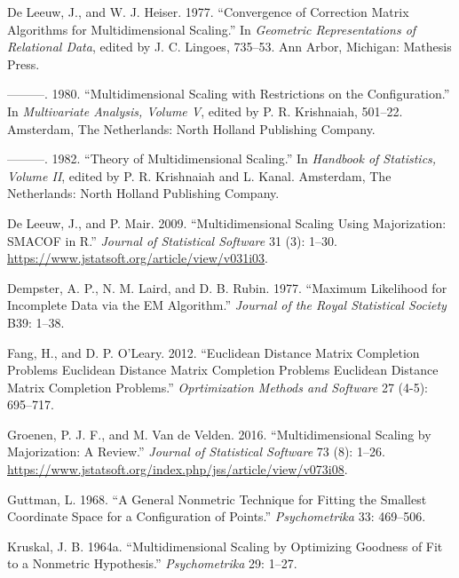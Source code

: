\documentclass[
  12pt,
  letterpaper,
  DIV=11,
  numbers=noendperiod]{scrartcl}
\newlength{\cslhangindent}
\newenvironment{CSLReferences}[2] %
 {\begin{list}{}{%
  \setlength{\itemindent}{0pt}
  \setlength{\leftmargin}{0pt}
  \setlength{\parsep}{0pt}
  \ifodd #1
   \setlength{\leftmargin}{\cslhangindent}
   \setlength{\itemindent}{-1\cslhangindent}
  \fi
  \setlength{\itemsep}{#2\baselineskip}}}
 {\end{list}}
\begin{document}
\begin{CSLReferences}{1}{0}
De Leeuw, J., and W. J. Heiser. 1977. {``Convergence of Correction
Matrix Algorithms for Multidimensional Scaling.''} In \emph{Geometric
Representations of Relational Data}, edited by J. C. Lingoes, 735--53.
Ann Arbor, Michigan: Mathesis Press.

---------. 1980. {``Multidimensional Scaling with Restrictions on the
Configuration.''} In \emph{Multivariate Analysis, Volume {V}}, edited by
P. R. Krishnaiah, 501--22. Amsterdam, The Netherlands: North Holland
Publishing Company.

---------. 1982. {``Theory of Multidimensional Scaling.''} In
\emph{Handbook of Statistics, Volume {II}}, edited by P. R. Krishnaiah
and L. Kanal. Amsterdam, The Netherlands: North Holland Publishing
Company.

De Leeuw, J., and P. Mair. 2009. {``{Multidimensional Scaling Using
Majorization: SMACOF in R}.''} \emph{Journal of Statistical Software} 31
(3): 1--30. \url{https://www.jstatsoft.org/article/view/v031i03}.

Dempster, A. P., N. M. Laird, and D. B. Rubin. 1977. {``{Maximum
Likelihood for Incomplete Data via the EM Algorithm}.''} \emph{Journal
of the Royal Statistical Society} B39: 1--38.

Fang, H., and D. P. O'Leary. 2012. {``Euclidean Distance Matrix
Completion Problems Euclidean Distance Matrix Completion Problems
Euclidean Distance Matrix Completion Problems.''} \emph{Oprtimization
Methods and Software} 27 (4-5): 695--717.

Groenen, P. J. F., and M. Van de Velden. 2016. {``{Multidimensional
Scaling by Majorization: A Review}.''} \emph{Journal of Statistical
Software} 73 (8): 1--26.
\url{https://www.jstatsoft.org/index.php/jss/article/view/v073i08}.

Guttman, L. 1968. {``{A General Nonmetric Technique for Fitting the
Smallest Coordinate Space for a Configuration of Points}.''}
\emph{Psychometrika} 33: 469--506.

Kruskal, J. B. 1964a. {``{Multidimensional Scaling by Optimizing
Goodness of Fit to a Nonmetric Hypothesis}.''} \emph{Psychometrika} 29:
1--27.


\end{CSLReferences}
\end{document}
